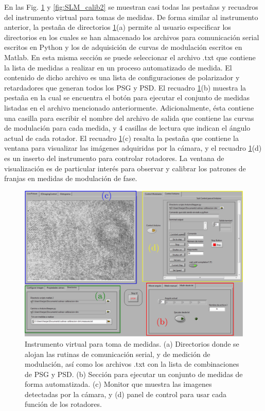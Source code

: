 En las Fig. \ref{fig:SLM_calib} y \ref{fig:SLM_calib2} se muestran
casi todas las pestañas y recuadros del instrumento virtual para tomas
de medidas. De forma similar al instrumento anterior, la pestaña de directorios
\ref{fig:SLM_calib}(a) permite al usuario especificar los directorios
en los cuales se han almacenado los archivos para comunicación serial
escritos en Python y los de adquisición de curvas de modulación
escritos en Matlab. En esta misma sección se puede seleccionar el
archivo .txt que contiene la lista de medidas a realizar en un proceso
automatizado de medida. El contenido de dicho archivo es una lista de
configuraciones de polarizador y retardadores que generan todos los
PSG y PSD. 
El recuadro \ref{fig:SLM_calib}(b) muestra la pestaña en la cual se
encuentra el botón para ejecutar el conjunto de medidas listadas en el
archivo mencionado anteriormente. Adicionalmente, ésta contiene una casilla
para escribir el nombre del archivo de salida que contiene las curvas
de modulación para cada medida, y 4 casillas de lectura que indican
el ángulo actual de cada rotador. El recuadro \ref{fig:SLM_calib}(c)
resalta la pestaña que contiene la ventana para visualizar las
imágenes adquiridas por la cámara, y el recuadro
\ref{fig:SLM_calib}(d) es un inserto del instrumento para controlar
rotadores. La ventana de visualización es de particular interés para
observar y calibrar los patrones de franjas en medidas de modulación
de fase.
\begin{figure}
\centering
\includegraphics[scale = .4]{SLM_calib.pdf} 
\caption[Interfaz del programa para toma de medidas 1.]{Instrumento
  virtual para toma de medidas. (a) Directorios donde se alojan las rutinas de comunicación serial, y
  de medición de modulación, así como los archivos .txt con la lista
  de combinaciones de PSG y PSD. (b) Sección para ejecutar un conjunto de
  medidas de forma automatizada. (c) Monitor que muestra las imagenes
  detectadas por la cámara, y (d) panel de control para usar cada función de
  los rotadores.}
\label{fig:SLM_calib}
\end{figure}

